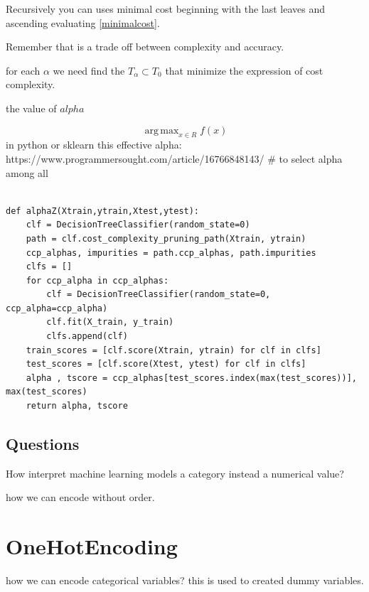 \documentclass[10pt,a4paper]{article}
\DeclareMathOperator*{\argmax}{arg\,max}
\begin{document}
Recursively you can uses minimal cost beginning with the last leaves and ascending evaluating \eqref{minimalcost}.


Remember that is a trade off between complexity and accuracy.

for each $\alpha$ we need find the $T_{\alpha} \subset T_{0}$ that minimize the expression of cost complexity. 

the value of $alpha$

\begin{algorithm}
\end{algorithm}




\begin{equation}
\argmax_{x \in R} f(x) 
\end{equation}
in python or sklearn this effective alpha:
https://www.programmersought.com/article/16766848143/ # to select alpha among all
\begin{lstlisting}

def alphaZ(Xtrain,ytrain,Xtest,ytest):
    clf = DecisionTreeClassifier(random_state=0)
    path = clf.cost_complexity_pruning_path(Xtrain, ytrain)
    ccp_alphas, impurities = path.ccp_alphas, path.impurities
    clfs = []
    for ccp_alpha in ccp_alphas:
        clf = DecisionTreeClassifier(random_state=0, ccp_alpha=ccp_alpha)
        clf.fit(X_train, y_train)
        clfs.append(clf)
    train_scores = [clf.score(Xtrain, ytrain) for clf in clfs]
    test_scores = [clf.score(Xtest, ytest) for clf in clfs]
    alpha , tscore = ccp_alphas[test_scores.index(max(test_scores))], max(test_scores)
    return alpha, tscore

\end{lstlisting}




\subsection{Questions}
How interpret machine learning models a category instead a numerical value?

how we can encode without order.



\section{OneHotEncoding}
how we can encode categorical variables?
this is used to created dummy variables.
\end{document}
